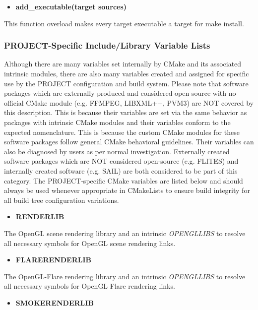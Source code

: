 \documentclass[12pt,letterpaper]{article}
\begin{document}
\begin{itemize}
\item \textbf{add\_executable(target sources)}
\end{itemize}

This function overload makes every target executable a target for make install.

\subsubsection{PROJECT-Specific Include/Library Variable Lists}

Although there are many variables set internally by CMake and its associated intrinsic modules, there are also many variables created and assigned for specific use by the PROJECT configuration and build system.  Please note that software packages which are externally produced and considered open source with no official CMake module (e.g. FFMPEG, LIBXML++, PVM3) are NOT covered by this description.  This is because their variables are set via the same behavior as packages with intrinsic CMake modules and their variables conform to the expected nomenclature.  This is because the custom CMake modules for these software packages follow general CMake behavioral guidelines.  Their variables can also be diagnosed by users as per normal investigation.  Externally created software packages which are NOT considered open-source (e.g. FLITES) and internally created software (e.g. SAIL) are both considered to be part of this category.  The PROJECT-specific CMake variables are listed below and should always be used whenever appropriate in CMakeLists to ensure build integrity for all build tree configuration variations.

\begin{itemize}
\item \textbf{RENDERLIB}
\end{itemize}

The OpenGL scene rendering library and an intrinsic \emph{OPENGLLIBS} to resolve all necessary symbols for OpenGL scene rendering links.

\begin{itemize}
\item \textbf{FLARERENDERLIB}
\end{itemize}

The OpenGL-Flare rendering library and an intrinsic \emph{OPENGLLIBS} to resolve all necessary symbols for OpenGL Flare rendering links.

\begin{itemize}
\item \textbf{SMOKERENDERLIB}
\end{itemize}
\end{document}
